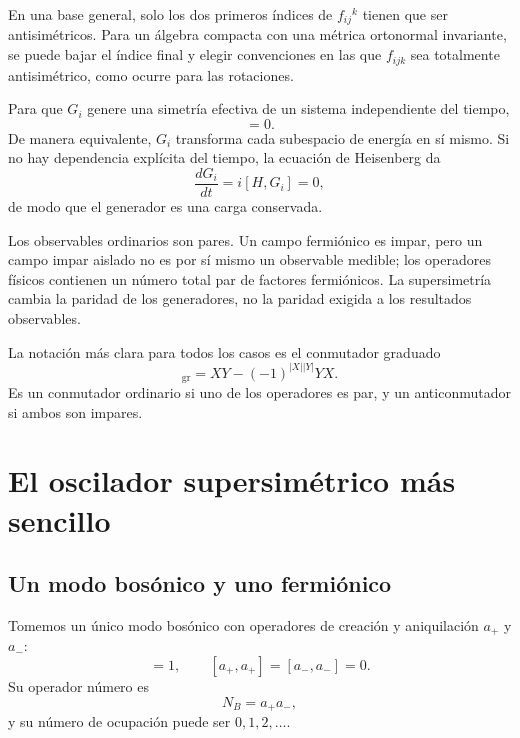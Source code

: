 En una base general, solo los dos primeros índices de \(f_{ij}{}^k\) tienen que ser antisimétricos. Para un álgebra compacta con una métrica ortonormal invariante, se puede bajar el índice final y elegir convenciones en las que \(f_{ijk}\) sea totalmente antisimétrico, como ocurre para las rotaciones. 

Para que \(G_i\) genere una simetría efectiva de un sistema independiente del tiempo,
\begin{equation}
[H,G_i]=0.
\end{equation}
De manera equivalente, \(G_i\) transforma cada subespacio de energía en sí mismo. Si no hay dependencia explícita del tiempo, la ecuación de Heisenberg da
\begin{equation}
\frac{dG_i}{dt}=i[H,G_i]=0,
\end{equation}
de modo que el generador es una carga conservada.

Los observables ordinarios son pares. Un campo fermiónico es impar, pero un campo impar aislado no es por sí mismo un observable medible; los operadores físicos contienen un número total par de factores fermiónicos. La supersimetría cambia la paridad de los generadores, no la paridad exigida a los resultados observables.

La notación más clara para todos los casos es el conmutador graduado
\begin{equation}
[X,Y]_{\mathrm{gr}}
=XY-(-1)^{|X||Y|}YX.
\end{equation}
Es un conmutador ordinario si uno de los operadores es par, y un anticonmutador si ambos son impares.

\section{El oscilador supersimétrico más sencillo}

\subsection{Un modo bosónico y uno fermiónico}

Tomemos un único modo bosónico con operadores de creación y aniquilación \(a_+\) y \(a_-\):
\begin{equation}
[a_-,a_+]=1,
\qquad
[a_+,a_+]=[a_-,a_-]=0.
\end{equation}
Su operador número es
\begin{equation}
N_B=a_+a_-,
\end{equation}
y su número de ocupación puede ser \(0,1,2,\ldots\).

